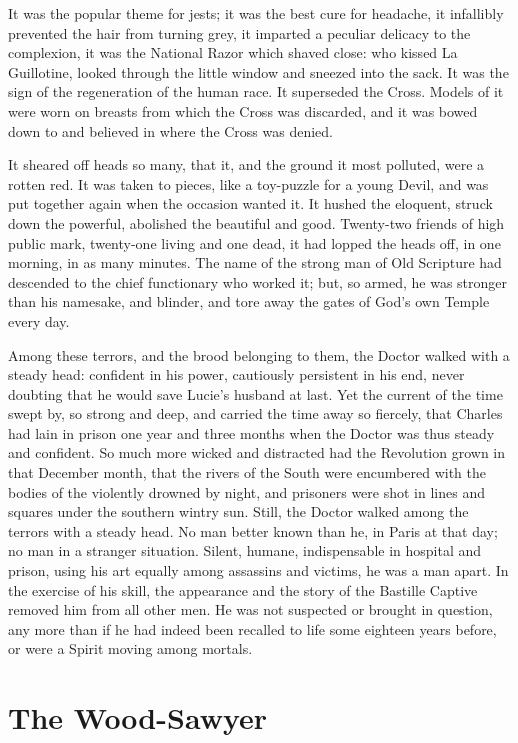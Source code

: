 It was the popular theme for jests; it was the best cure for
headache, it infallibly prevented the hair from turning grey, it
imparted a peculiar delicacy to the complexion, it was the National
Razor which shaved close:  who kissed La Guillotine, looked through
the little window and sneezed into the sack.  It was the sign of the
regeneration of the human race.  It superseded the Cross.  Models of
it were worn on breasts from which the Cross was discarded, and it
was bowed down to and believed in where the Cross was denied.

It sheared off heads so many, that it, and the ground it most
polluted, were a rotten red.  It was taken to pieces, like a
toy-puzzle for a young Devil, and was put together again when the
occasion wanted it.  It hushed the eloquent, struck down the powerful,
abolished the beautiful and good.  Twenty-two friends of high public
mark, twenty-one living and one dead, it had lopped the heads off,
in one morning, in as many minutes.  The name of the strong man of
Old Scripture had descended to the chief functionary who worked it;
but, so armed, he was stronger than his namesake, and blinder, and
tore away the gates of God's own Temple every day.

Among these terrors, and the brood belonging to them, the Doctor
walked with a steady head:  confident in his power, cautiously
persistent in his end, never doubting that he would save Lucie's
husband at last. Yet the current of the time swept by, so strong and
deep, and carried the time away so fiercely, that Charles had lain in
prison one year and three months when the Doctor was thus steady and
confident.  So much more wicked and distracted had the Revolution
grown in that December month, that the rivers of the South were
encumbered with the bodies of the violently drowned by night, and
prisoners were shot in lines and squares under the southern wintry sun.
Still, the Doctor walked among the terrors with a steady head.
No man better known than he, in Paris at that day; no man in a
stranger situation.  Silent, humane, indispensable in hospital and
prison, using his art equally among assassins and victims, he was a
man apart.  In the exercise of his skill, the appearance and the
story of the Bastille Captive removed him from all other men.  He was
not suspected or brought in question, any more than if he had indeed
been recalled to life some eighteen years before, or were a Spirit
moving among mortals.



\chapter{The Wood-Sawyer}



